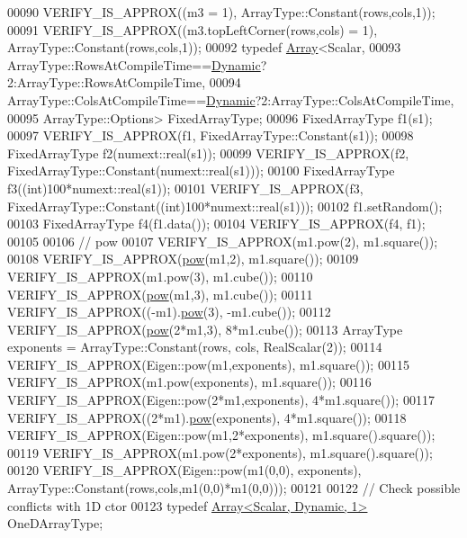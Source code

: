 \begin{DoxyCode}
00090   VERIFY\_IS\_APPROX((m3 = 1),  ArrayType::Constant(rows,cols,1));
00091   VERIFY\_IS\_APPROX((m3.topLeftCorner(rows,cols) = 1),  ArrayType::Constant(rows,cols,1));
00092   \textcolor{keyword}{typedef} \hyperlink{group___core___module_class_eigen_1_1_array}{Array}<Scalar,
00093                 ArrayType::RowsAtCompileTime==\hyperlink{namespace_eigen_ad81fa7195215a0ce30017dfac309f0b2}{Dynamic}?2:ArrayType::RowsAtCompileTime,
00094                 ArrayType::ColsAtCompileTime==\hyperlink{namespace_eigen_ad81fa7195215a0ce30017dfac309f0b2}{Dynamic}?2:ArrayType::ColsAtCompileTime,
00095                 ArrayType::Options> FixedArrayType;
00096   FixedArrayType f1(s1);
00097   VERIFY\_IS\_APPROX(f1, FixedArrayType::Constant(s1));
00098   FixedArrayType f2(numext::real(s1));
00099   VERIFY\_IS\_APPROX(f2, FixedArrayType::Constant(numext::real(s1)));
00100   FixedArrayType f3((\textcolor{keywordtype}{int})100*numext::real(s1));
00101   VERIFY\_IS\_APPROX(f3, FixedArrayType::Constant((\textcolor{keywordtype}{int})100*numext::real(s1)));
00102   f1.setRandom();
00103   FixedArrayType f4(f1.data());
00104   VERIFY\_IS\_APPROX(f4, f1);
00105   
00106   \textcolor{comment}{// pow}
00107   VERIFY\_IS\_APPROX(m1.pow(2), m1.square());
00108   VERIFY\_IS\_APPROX(\hyperlink{group___core___module_ab6dc101d82e8228a19a8840e3a29c1c9}{pow}(m1,2), m1.square());
00109   VERIFY\_IS\_APPROX(m1.pow(3), m1.cube());
00110   VERIFY\_IS\_APPROX(\hyperlink{group___core___module_ab6dc101d82e8228a19a8840e3a29c1c9}{pow}(m1,3), m1.cube());
00111   VERIFY\_IS\_APPROX((-m1).\hyperlink{group___core___module_ab6dc101d82e8228a19a8840e3a29c1c9}{pow}(3), -m1.cube());
00112   VERIFY\_IS\_APPROX(\hyperlink{group___core___module_ab6dc101d82e8228a19a8840e3a29c1c9}{pow}(2*m1,3), 8*m1.cube());
00113   ArrayType exponents = ArrayType::Constant(rows, cols, RealScalar(2));
00114   VERIFY\_IS\_APPROX(Eigen::pow(m1,exponents), m1.square());
00115   VERIFY\_IS\_APPROX(m1.pow(exponents), m1.square());
00116   VERIFY\_IS\_APPROX(Eigen::pow(2*m1,exponents), 4*m1.square());
00117   VERIFY\_IS\_APPROX((2*m1).\hyperlink{group___core___module_ab6dc101d82e8228a19a8840e3a29c1c9}{pow}(exponents), 4*m1.square());
00118   VERIFY\_IS\_APPROX(Eigen::pow(m1,2*exponents), m1.square().square());
00119   VERIFY\_IS\_APPROX(m1.pow(2*exponents), m1.square().square());
00120   VERIFY\_IS\_APPROX(Eigen::pow(m1(0,0), exponents), ArrayType::Constant(rows,cols,m1(0,0)*m1(0,0)));
00121 
00122   \textcolor{comment}{// Check possible conflicts with 1D ctor}
00123   \textcolor{keyword}{typedef} \hyperlink{group___core___module_class_eigen_1_1_array}{Array<Scalar, Dynamic, 1>} OneDArrayType;

\end{DoxyCode}
